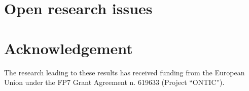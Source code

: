 \documentclass[preprint,review,12pt]{elsarticle}
\begin{document}
\section{Open research issues}
\label{openissues}
%


%

\section*{Acknowledgement}
The research leading to these results has received funding from the European
Union under the FP7 Grant Agreement n. 619633 (Project ``ONTIC'').




{}





\end{document}
